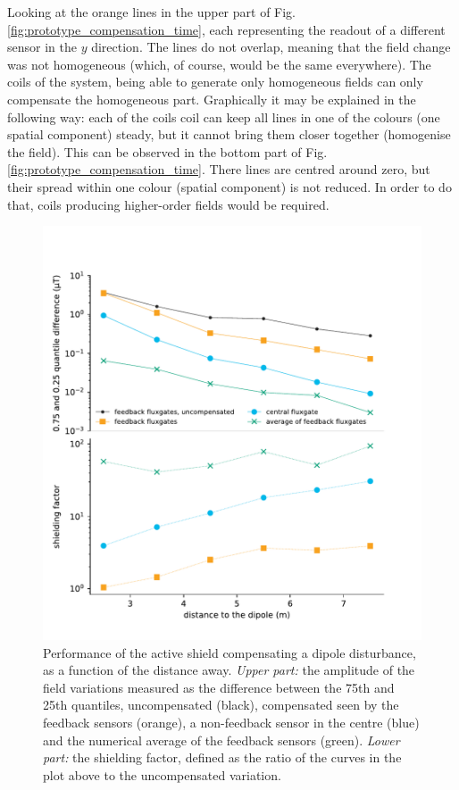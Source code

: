 Looking at the orange lines in the upper part of Fig.\,\ref{fig:prototype_compensation_time}, each representing the readout of a different sensor in the $y$ direction.
The lines do not overlap, meaning that the field change was not homogeneous (which, of course, would be the same everywhere).
The coils of the system, being able to generate only homogeneous fields can only compensate the homogeneous part.
Graphically it may be explained in the following way: each of the coils coil can keep all lines in one of the colours (one spatial component) steady, but it cannot bring them closer together (homogenise the field).
This can be observed in the bottom part of Fig.\,\ref{fig:prototype_compensation_time}.
There lines are centred around zero, but their spread within one colour (spatial component) is not reduced.
In order to do that, coils producing higher-order fields would be required.

\begin{figure}
  \centering
  \includegraphics[width=0.85\linewidth]{gfx/prototype/big_magnet_performance_shielding_factor.pdf}
  \caption{Performance of the active shield compensating a dipole disturbance, as a function of the distance away. \emph{Upper part:} the amplitude of the field variations measured as the difference between the 75th and 25th quantiles, uncompensated (black), compensated seen by the feedback sensors (orange), a non-feedback sensor in the centre (blue) and the numerical average of the feedback sensors (green). \emph{Lower part:} the shielding factor, defined as the ratio of the curves in the plot above to the uncompensated variation.}\label{fig:prototype_compensation}
\end{figure}

